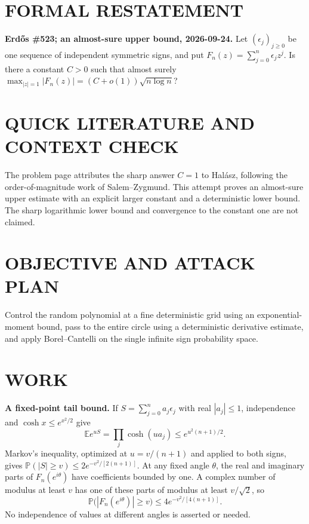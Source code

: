 \section{FORMAL RESTATEMENT}
\textbf{Erd\H{o}s \#523; an almost-sure upper bound, 2026-09-24.}
Let $(\epsilon_j)_{j\geq0}$ be one sequence of independent symmetric signs, and put
$F_n(z)=\sum_{j=0}^n\epsilon_jz^j$. Is there a constant $C>0$ such that almost surely
$\max_{|z|=1}|F_n(z)|=(C+o(1))\sqrt{n\log n}$?

\section{QUICK LITERATURE AND CONTEXT CHECK}
The problem page attributes the sharp answer $C=1$ to Hal\'asz, following the order-of-magnitude work of Salem--Zygmund. This attempt proves an almost-sure upper estimate with an explicit larger constant and a deterministic lower bound. The sharp logarithmic lower bound and convergence to the constant one are not claimed.

\section{OBJECTIVE AND ATTACK PLAN}
Control the random polynomial at a fine deterministic grid using an exponential-moment bound, pass to the entire circle using a deterministic derivative estimate, and apply Borel--Cantelli on the single infinite sign probability space.

\section{WORK}
\textbf{A fixed-point tail bound.} If $S=\sum_{j=0}^n a_j\epsilon_j$ with real $|a_j|\leq1$, independence and $\cosh x\leq e^{x^2/2}$ give
\[
 \mathbb E e^{uS}=\prod_j\cosh(ua_j)
 \leq e^{u^2(n+1)/2}.
\]
Markov's inequality, optimized at $u=v/(n+1)$ and applied to both signs, gives
$\mathbb P(|S|\geq v)\leq2e^{-v^2/[2(n+1)]}$.
At any fixed angle $\theta$, the real and imaginary parts of $F_n(e^{i\theta})$ have coefficients bounded by one. A complex number of modulus at least $v$ has one of these parts of modulus at least $v/\sqrt2$, so
\[
 \mathbb P\bigl(|F_n(e^{i\theta})|\geq v\bigr)
 \leq4e^{-v^2/[4(n+1)]}.                              \tag{1}
\]
No independence of values at different angles is asserted or needed.

